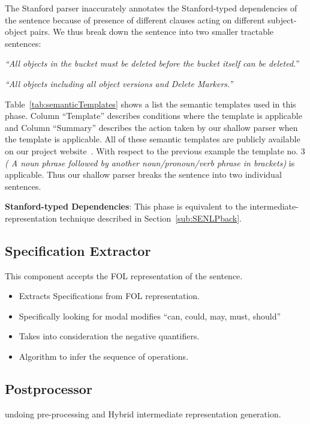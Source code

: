 The Stanford parser inaccurately annotates the Stanford-typed dependencies of the sentence because of presence of different clauses acting on different subject-object pairs.
We thus break down the sentence into two smaller tractable sentences:

\begin{center}
\scriptsize \textit{``All objects in the bucket must be deleted before the bucket itself can be deleted.}''
	
\textit{``All objects including all object versions and Delete Markers.''}\normalsize 
\end{center} 


Table~\ref{tab:semanticTemplates} shows a list the semantic templates used in this phase.
Column ``Template'' describes conditions where the template is applicable and Column ``Summary'' describes the action taken by our shallow parser when the template is applicable.
All of these semantic templates are publicly available on our project website~\cite{projectweb}.
With respect to the previous example the template no. 3 \textit{( A noun phrase followed by another noun/pronoun/verb phrase in brackets)} is applicable.
Thus our shallow parser breaks the sentence into two individual sentences.
	 
\textbf{Stanford-typed Dependencies}: This phase is equivalent to the intermediate-representation technique described in Section~\ref{sub:SENLPback}.

\subsection{Specification Extractor}
\label{sub:SE}

This component accepts the FOL representation of the sentence.

\begin{itemize}
\item Extracts Specifications from FOL representation. 
\item Specifically looking for modal modifies ``can, could, may, must, should'' 
\item Takes into consideration the negative quantifiers.
\item Algorithm to infer the sequence of operations.
\end{itemize}


\subsection{Postprocessor}
\label{sub:postpro}
undoing pre-processing and Hybrid intermediate representation generation.



